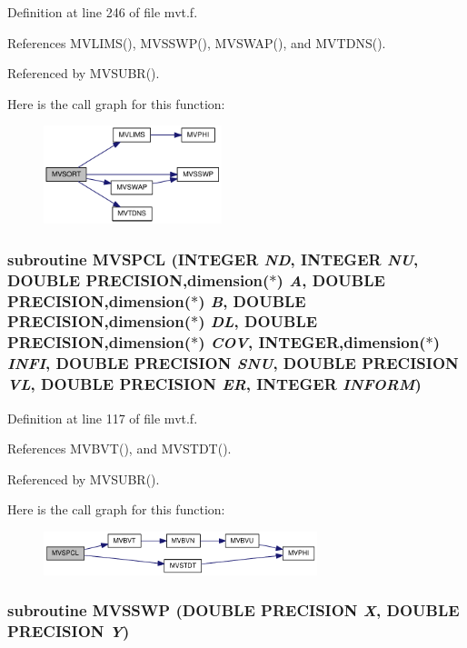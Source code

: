 Definition at line 246 of file mvt.f.

References MVLIMS(), MVSSWP(), MVSWAP(), and MVTDNS().

Referenced by MVSUBR().

Here is the call graph for this function:\nopagebreak
\begin{figure}[H]
\begin{center}
\leavevmode
\includegraphics[width=147pt]{mvt_8f_e6a30b16d74f1c585c70de45080c0805_cgraph}
\end{center}
\end{figure}
\hypertarget{mvt_8f_cb964c59585b62348fb9653f052c669e}{
\subsubsection[{MVSPCL}]{\setlength{\rightskip}{0pt plus 5cm}subroutine MVSPCL (INTEGER {\em ND}, \/  INTEGER {\em NU}, \/  DOUBLE PRECISION,dimension($\ast$) {\em A}, \/  DOUBLE PRECISION,dimension($\ast$) {\em B}, \/  DOUBLE PRECISION,dimension($\ast$) {\em DL}, \/  DOUBLE PRECISION,dimension($\ast$) {\em COV}, \/  INTEGER,dimension($\ast$) {\em INFI}, \/  DOUBLE PRECISION {\em SNU}, \/  DOUBLE PRECISION {\em VL}, \/  DOUBLE PRECISION {\em ER}, \/  INTEGER {\em INFORM})}}
\label{mvt_8f_cb964c59585b62348fb9653f052c669e}




Definition at line 117 of file mvt.f.

References MVBVT(), and MVSTDT().

Referenced by MVSUBR().

Here is the call graph for this function:\nopagebreak
\begin{figure}[H]
\begin{center}
\leavevmode
\includegraphics[width=226pt]{mvt_8f_cb964c59585b62348fb9653f052c669e_cgraph}
\end{center}
\end{figure}
\hypertarget{mvt_8f_2a36c253875e26e22bbb20a386c9a580}{
\subsubsection[{MVSSWP}]{\setlength{\rightskip}{0pt plus 5cm}subroutine MVSSWP (DOUBLE PRECISION {\em X}, \/  DOUBLE PRECISION {\em Y})}}
\label{mvt_8f_2a36c253875e26e22bbb20a386c9a580}




